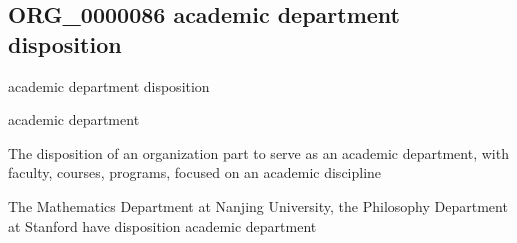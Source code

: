 \documentclass[letterpaper,10pt,english]{sphinxmanual}
\begin{document}
\subsection{ORG\_0000086 \sphinxhyphen{} academic department disposition}
\label{\detokenize{doc-ORG_0000086:org-0000086-academic-department-disposition}}\label{\detokenize{doc-ORG_0000086:index-0}}\label{\detokenize{doc-ORG_0000086::doc}}
\begin{sphinxShadowBox}

\sphinxAtStartPar
academic department disposition
\end{sphinxShadowBox}

\begin{sphinxShadowBox}

\sphinxAtStartPar
academic department
\end{sphinxShadowBox}

\begin{sphinxShadowBox}

\sphinxAtStartPar
{\hyperref[\detokenize{doc-BFO_0000016::doc}]{}}
\end{sphinxShadowBox}

\begin{sphinxShadowBox}

\sphinxAtStartPar
The disposition of an organization part to serve as an academic department, with faculty, courses, programs, focused on an academic discipline
\end{sphinxShadowBox}

\begin{sphinxShadowBox}

\sphinxAtStartPar
{}
\end{sphinxShadowBox}

\begin{sphinxShadowBox}

\sphinxAtStartPar
The Mathematics Department at Nanjing University, the Philosophy Department at Stanford have disposition academic department
\end{sphinxShadowBox}

\begin{sphinxShadowBox}

\sphinxAtStartPar
{}
\end{sphinxShadowBox}
\end{document}
